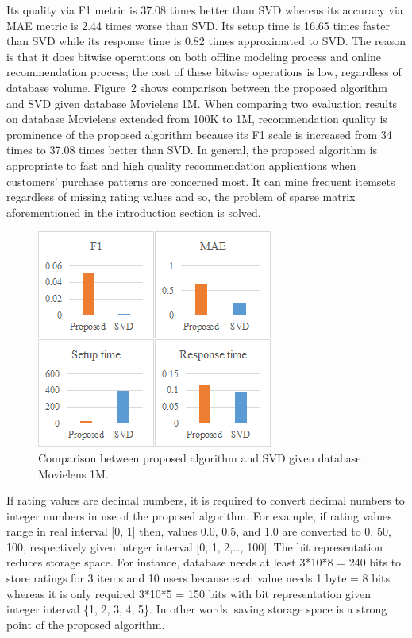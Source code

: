 \documentclass{article}
\begin{document}
Its quality via F1 metric is 37.08 times better than SVD whereas its accuracy via MAE metric is 2.44 times worse than SVD. Its setup time is 16.65 times faster than SVD while its response time is 0.82 times approximated to SVD. The reason is that it does bitwise operations on both offline modeling process and online recommendation process; the cost of these bitwise operations is low, regardless of database volume. Figure~2 shows comparison between the proposed algorithm and SVD given database Movielens 1M. When comparing two evaluation results on database Movielens extended from 100K to 1M, recommendation quality is prominence of the proposed algorithm because its F1 scale is increased from 34 times to 37.08 times better than SVD. In general, the proposed algorithm is appropriate to fast and high quality recommendation applications when customers' purchase patterns are concerned most. It can mine frequent itemsets regardless of missing rating values and so, the problem of sparse matrix aforementioned in the introduction section is solved.
\begin{figure} \label{figure:comparison1m}
\centering
\includegraphics{Comparison1M.png}
\caption{Comparison between proposed algorithm and SVD given database Movielens 1M.}
\label{figure:time100K}
\end{figure}

If rating values are decimal numbers, it is required to convert decimal numbers to integer numbers in use of the proposed algorithm. For example, if rating values range in real interval [0, 1] then, values 0.0, 0.5, and 1.0 are converted to 0, 50, 100, respectively given integer interval [0, 1, 2,\ldots, 100]. The bit representation reduces storage space. For instance, database needs at least 3*10*8 = 240 bits to store ratings for 3 items and 10 users because each value needs 1 byte = 8 bits whereas it is only required 3*10*5 = 150 bits with bit representation given integer interval \{1, 2, 3, 4, 5\}. In other words, saving storage space is a strong point of the proposed algorithm.
\end{document}
